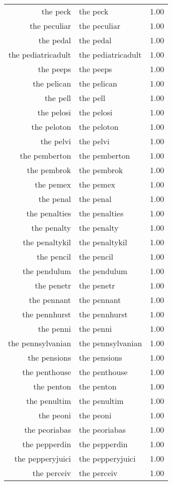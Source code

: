 \begin{table}[ht]
\begin{tabular}{rlr}
  the peck & the peck & 1.00 \\ 
  the peculiar & the peculiar & 1.00 \\ 
  the pedal & the pedal & 1.00 \\ 
  the pediatricadult & the pediatricadult & 1.00 \\ 
  the peeps & the peeps & 1.00 \\ 
  the pelican & the pelican & 1.00 \\ 
  the pell & the pell & 1.00 \\ 
  the pelosi & the pelosi & 1.00 \\ 
  the peloton & the peloton & 1.00 \\ 
  the pelvi & the pelvi & 1.00 \\ 
  the pemberton & the pemberton & 1.00 \\ 
  the pembrok & the pembrok & 1.00 \\ 
  the pemex & the pemex & 1.00 \\ 
  the penal & the penal & 1.00 \\ 
  the penalties & the penalties & 1.00 \\ 
  the penalty & the penalty & 1.00 \\ 
  the penaltykil & the penaltykil & 1.00 \\ 
  the pencil & the pencil & 1.00 \\ 
  the pendulum & the pendulum & 1.00 \\ 
  the penetr & the penetr & 1.00 \\ 
  the pennant & the pennant & 1.00 \\ 
  the pennhurst & the pennhurst & 1.00 \\ 
  the penni & the penni & 1.00 \\ 
  the pennsylvanian & the pennsylvanian & 1.00 \\ 
  the pensions & the pensions & 1.00 \\ 
  the penthouse & the penthouse & 1.00 \\ 
  the penton & the penton & 1.00 \\ 
  the penultim & the penultim & 1.00 \\ 
  the peoni & the peoni & 1.00 \\ 
  the peoriabas & the peoriabas & 1.00 \\ 
  the pepperdin & the pepperdin & 1.00 \\ 
  the pepperyjuici & the pepperyjuici & 1.00 \\ 
  the perceiv & the perceiv & 1.00 \\ 

\end{tabular}
\end{table}
